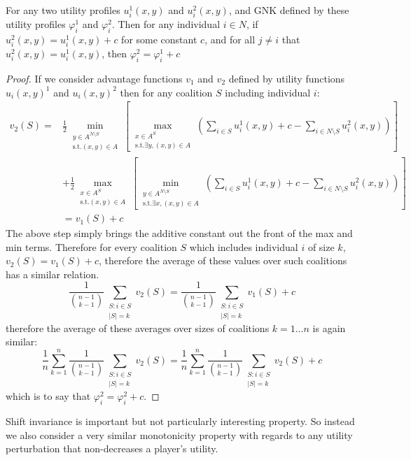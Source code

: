 \begin{theorem}
For any two utility profiles $u^1_i(x,y)$ and $u^2_i(x,y)$, and GNK defined by these utility profiles $\varphi_i^1$ and $\varphi_i^2$.
Then for any individual $i\in N$, if $u_i^2(x,y) = u_i^1(x,y)+c$ for some constant $c$, and for all $j\neq i$ that $u^2_i(x,y) = u^1_i(x,y)$, then $\varphi_i^2 = \varphi_i^1+c$ 
\end{theorem}
\begin{proof}
If we consider advantage functions $v_1$ and $v_2$ defined by utility functions $u_i(x,y)^1$ and $u_i(x,y)^2$ then for any coalition $S$ including individual $i$:
\begin{align}
v_2(S) = &
\frac{1}{2}\min_{\substack{y\in A^{N\setminus S} \\ \text{s.t.}(x,y)\in A}} \left[
\max_{\substack{x\in A^S \\ \text{s.t.}\exists y,(x,y)\in A}}
	\left(\sum_{i\in S} u^1_i(x,y)+c - \sum_{i\in N\setminus S}u_i^2(x,y)\right)\right]\nonumber\\
& +
\frac{1}{2}\max_{\substack{x\in A^S \\ \text{s.t.}(x,y)\in A}} \left[
\min_{\substack{y\in A^{N\setminus S} \\ \text{s.t.}\exists x,(x,y)\in A}}
	\left(\sum_{i\in S} u^1_i(x,y)+c - \sum_{i\in N\setminus S} u_i^2(x,y) \right) \right]\nonumber\\
&= v_1(S)+c\nonumber
\end{align}
The above step simply brings the additive constant out the front of the max and min terms.
Therefore for every coalition $S$ which includes individual $i$ of size $k$, $v_2(S)=v_1(S)+c$, therefore the average of these values over such coalitions has a similar relation.
$$\frac{1}{\binom{n-1}{k-1}} \sum_{\substack{S:i\in S \\ |S|=k}}v_2(S) = \frac{1}{\binom{n-1}{k-1}} \sum_{\substack{S:i\in S \\ |S|=k}}v_1(S) + c$$
therefore the average of these averages over sizes of coalitions $k=1\dots n$ is again similar:
$$\frac{1}{n}\sum_{k=1}^n \frac{1}{\binom{n-1}{k-1}} \sum_{\substack{S:i\in S \\ |S|=k}}v_2(S) = \frac{1}{n}\sum_{k=1}^n \frac{1}{\binom{n-1}{k-1}} \sum_{\substack{S:i\in S \\ |S|=k}}v_2(S) + c$$
which is to say that $\varphi_i^2 = \varphi_i^2+c$.
\end{proof}

Shift invariance is important but not particularly interesting property.
So instead we also consider a very similar monotonicity property with regards to any utility perturbation that non-decreases a player's utility.

